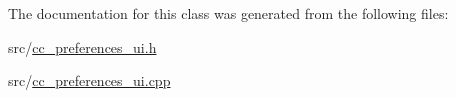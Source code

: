 The documentation for this class was generated from the following files\-:\begin{DoxyCompactItemize}
\item 
src/\hyperlink{a00188}{cc\-\_\-preferences\-\_\-ui.\-h}\item 
src/\hyperlink{a00187}{cc\-\_\-preferences\-\_\-ui.\-cpp}\end{DoxyCompactItemize}
